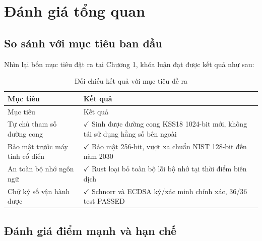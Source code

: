 \section{Đánh giá tổng quan}\label{ux111uxe1nh-giuxe1-tux1ed5ng-quan}

\subsection{So sánh với mục tiêu ban
đầu}\label{so-suxe1nh-vux1edbi-mux1ee5c-tiuxeau-ban-ux111ux1ea7u}

Nhìn lại bốn mục tiêu đặt ra tại Chương 1, khóa luận đạt được kết quả
như sau:

\begin{longtable}[]{@{}
  >{\raggedright\arraybackslash}p{}
  >{\raggedright\arraybackslash}p{}@{}}
\caption{Đối chiếu kết quả với mục tiêu đề ra}\tabularnewline
\toprule\noalign{}
\begin{minipage}[b]{\linewidth}\raggedright
Mục tiêu
\end{minipage} & \begin{minipage}[b]{\linewidth}\raggedright
Kết quả
\end{minipage} \\
\midrule\noalign{}
\endfirsthead
\toprule\noalign{}
\begin{minipage}[b]{\linewidth}\raggedright
Mục tiêu
\end{minipage} & \begin{minipage}[b]{\linewidth}\raggedright
Kết quả
\end{minipage} \\
\midrule\noalign{}
\endhead
\bottomrule\noalign{}
\endlastfoot
Tự chủ tham số đường cong & \(\checkmark\) Sinh được đường cong KSS18
1024-bit mới, không tái sử dụng hằng số bên ngoài \\
Bảo mật trước máy tính cổ điển & \(\checkmark\) Bảo mật 256-bit, vượt xa
chuẩn NIST 128-bit đến năm 2030 \\
An toàn bộ nhớ ngôn ngữ & \(\checkmark\) Rust loại bỏ toàn bộ lỗi bộ nhớ
tại thời điểm biên dịch \\
Chữ ký số vận hành được & \(\checkmark\) Schnorr và ECDSA ký/xác minh
chính xác, 36/36 test PASSED \\
\end{longtable}

\subsection{Đánh giá điểm mạnh và hạn
chế}\label{ux111uxe1nh-giuxe1-ux111iux1ec3m-mux1ea1nh-vuxe0-hux1ea1n-chux1ebf}

